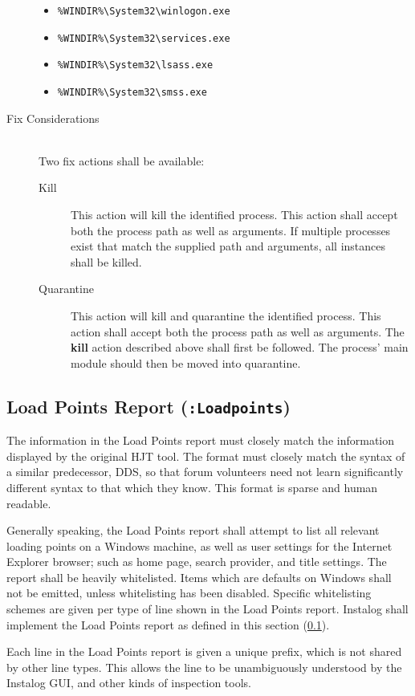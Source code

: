 \begin{description}
\begin{itemize}
  \item \verb|%WINDIR%\System32\winlogon.exe|
  \item \verb|%WINDIR%\System32\services.exe|
  \item \verb|%WINDIR%\System32\lsass.exe|
  \item \verb|%WINDIR%\System32\smss.exe|
\end{itemize}
\item[Fix Considerations] \hfill \\
Two fix actions shall be available:
\begin{description}
\item[Kill] This action will kill the identified process.  This action shall
accept both the process path as well as arguments.  If multiple processes exist
that match the supplied path and arguments, all instances shall be killed. 
\item[Quarantine]  This action will kill and quarantine the identified
process.  This action shall accept both the process path as well as arguments. 
The \textbf{kill} action described above shall first be followed.  The process'
main module should then be moved into quarantine.
\end{description}
\end{description}

\subsection{Load Points Report (\texttt{:Loadpoints})} \label{hjtgeneral}
The information in the Load Points report must closely match the information
displayed by the original HJT tool. The format must closely match the syntax of
a similar predecessor, DDS, so that forum volunteers need not learn
significantly different syntax to that which they know. This format is
sparse and human readable. 

Generally speaking, the Load Points report shall attempt to list all relevant
loading points on a Windows machine, as well as user settings for the Internet
Explorer browser; such as home page, search provider, and title settings. The
report shall be heavily whitelisted. Items which are defaults on Windows shall
not be emitted, unless whitelisting has been disabled. Specific whitelisting
schemes are given per type of line shown in the Load Points report. Instalog shall
implement the Load Points report as defined in this section (\ref{hjtgeneral}).

Each line in the Load Points report is given a unique prefix, which is not shared
by other line types. This allows the line to be unambiguously understood by the
Instalog GUI, and other kinds of inspection tools.

